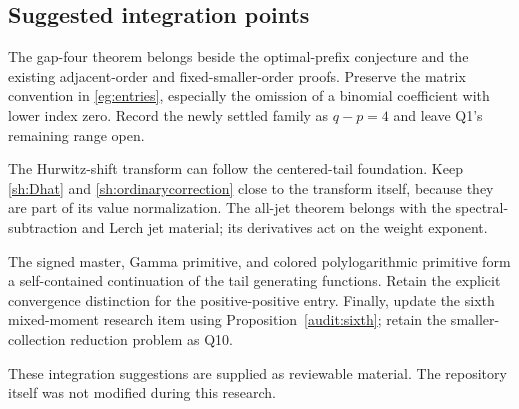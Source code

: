 \subsection{Suggested integration points}

The gap-four theorem belongs beside the optimal-prefix conjecture and
the existing adjacent-order and fixed-smaller-order proofs. Preserve
the matrix convention in \eqref{eg:entries}, especially the omission
of a binomial coefficient with lower index zero. Record the newly
settled family as $q-p=4$ and leave Q1's remaining range open.

The Hurwitz-shift transform can follow the centered-tail foundation.
Keep \eqref{sh:Dhat} and \eqref{sh:ordinarycorrection} close to the
transform itself, because they are part of its value normalization.
The all-jet theorem belongs with the spectral-subtraction and Lerch
jet material; its derivatives act on the weight exponent.

The signed master, Gamma primitive, and colored polylogarithmic
primitive form a self-contained continuation of the tail generating
functions. Retain the explicit convergence distinction for the
positive-positive entry. Finally, update the sixth mixed-moment
research item using Proposition~\ref{audit:sixth}; retain the
smaller-collection reduction problem as Q10.

These integration suggestions are supplied as reviewable material.
The repository itself was not modified during this research.
